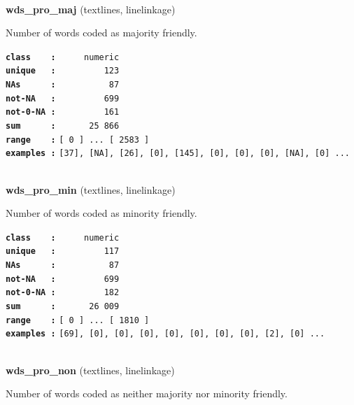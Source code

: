 \documentclass[]{article}
\begin{document}
~

\textbf{wds\_pro\_maj} (textlines, linelinkage)

Number of words coded as majority friendly.

\textbf{\texttt{class\ \ \ \ :}} \texttt{~~~~~numeric}\\
\textbf{\texttt{unique\ \ \ :}} \texttt{~~~~~~~~~123}\\
\textbf{\texttt{NAs\ \ \ \ \ \ :}} \texttt{~~~~~~~~~~87}\\
\textbf{\texttt{not-NA\ \ \ :}} \texttt{~~~~~~~~~699}\\
\textbf{\texttt{not-0-NA\ :}} \texttt{~~~~~~~~~161}\\
\textbf{\texttt{sum\ \ \ \ \ \ :}} \texttt{~~~~~~25~866}\\
\textbf{\texttt{range\ \ \ \ :}}
\texttt{{[}\ 0\ {]}\ ...\ {[}\ 2583\ {]}}\\
\textbf{\texttt{examples\ :}}
\texttt{{[}37{]},\ {[}NA{]},\ {[}26{]},\ {[}0{]},\ {[}145{]},\ {[}0{]},\ {[}0{]},\ {[}0{]},\ {[}NA{]},\ {[}0{]}\ ...}\\

~

\textbf{wds\_pro\_min} (textlines, linelinkage)

Number of words coded as minority friendly.

\textbf{\texttt{class\ \ \ \ :}} \texttt{~~~~~numeric}\\
\textbf{\texttt{unique\ \ \ :}} \texttt{~~~~~~~~~117}\\
\textbf{\texttt{NAs\ \ \ \ \ \ :}} \texttt{~~~~~~~~~~87}\\
\textbf{\texttt{not-NA\ \ \ :}} \texttt{~~~~~~~~~699}\\
\textbf{\texttt{not-0-NA\ :}} \texttt{~~~~~~~~~182}\\
\textbf{\texttt{sum\ \ \ \ \ \ :}} \texttt{~~~~~~26~009}\\
\textbf{\texttt{range\ \ \ \ :}}
\texttt{{[}\ 0\ {]}\ ...\ {[}\ 1810\ {]}}\\
\textbf{\texttt{examples\ :}}
\texttt{{[}69{]},\ {[}0{]},\ {[}0{]},\ {[}0{]},\ {[}0{]},\ {[}0{]},\ {[}0{]},\ {[}0{]},\ {[}2{]},\ {[}0{]}\ ...}\\

~

\textbf{wds\_pro\_non} (textlines, linelinkage)

Number of words coded as neither majority nor minority friendly.
\end{document}
